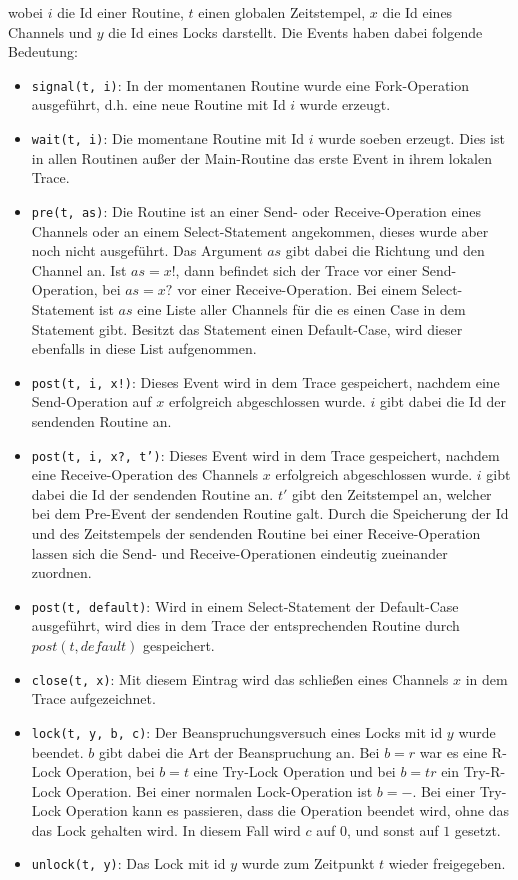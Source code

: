 wobei $i$ die Id einer Routine, $t$ einen globalen Zeitstempel, $x$ die Id eines 
Channels und $y$ die Id eines Locks darstellt. Die Events haben dabei folgende Bedeutung:
\begin{itemize}
  \item \texttt{signal(t, i)}: In der momentanen Routine wurde
    eine Fork-Operation ausgeführt,
    d.h. eine neue Routine mit Id $i$ wurde erzeugt.
  \item \texttt{wait(t, i)}: Die momentane Routine mit Id $i$ wurde soeben erzeugt. Dies ist 
    in allen Routinen außer der Main-Routine das erste Event in ihrem lokalen Trace.
  \item \texttt{pre(t, as)}: Die Routine ist an einer Send- oder Receive-Operation eines 
    Channels oder an einem Select-Statement angekommen, dieses wurde aber noch nicht 
    ausgeführt. Das Argument $as$ gibt dabei die Richtung und den Channel an. 
    Ist $as = x!$, dann befindet sich der Trace vor einer Send-Operation, bei 
    $as = x?$ vor einer Receive-Operation. Bei einem Select-Statement ist 
    $as$ eine Liste aller Channels für die es einen 
    Case in dem Statement gibt. Besitzt das Statement einen Default-Case, wird
    dieser ebenfalls in diese List aufgenommen.
  \item \texttt{post(t, i, x!)}: Dieses Event wird in dem Trace gespeichert, nachdem 
    eine Send-Operation auf $x$ erfolgreich abgeschlossen wurde. 
    $i$ gibt dabei die Id der sendenden Routine
    an.
  \item \texttt{post(t, i, x?, t')}: Dieses Event wird in dem Trace gespeichert, nachdem 
    eine Receive-Operation des Channels $x$ erfolgreich abgeschlossen wurde. 
    $i$ gibt dabei die Id der sendenden Routine an. $t'$ gibt den Zeitstempel an,
    welcher bei dem Pre-Event der sendenden Routine galt. Durch die Speicherung der Id und des 
    Zeitstempels der sendenden Routine bei einer Receive-Operation lassen sich 
    die Send- und Receive-Operationen eindeutig zueinander zuordnen.
  \item \texttt{post(t, default)}: Wird in einem Select-Statement der Default-Case ausgeführt,
    wird dies in dem Trace der entsprechenden Routine durch $post(t, default)$ 
    gespeichert.
  \item \texttt{close(t, x)}: Mit diesem Eintrag wird das schließen eines Channels $x$ 
    in dem Trace aufgezeichnet.
  \item \texttt{lock(t, y, b, c)}: Der Beanspruchungsversuch eines Locks mit id $y$ wurde beendet. 
    $b$ gibt dabei die Art der Beanspruchung an. Bei $b = r$ war es eine R-Lock
    Operation, bei $b = t$ eine Try-Lock Operation und bei $b = tr$ ein Try-R-Lock
    Operation. Bei einer normalen Lock-Operation ist $b = -$. Bei einer 
    Try-Lock Operation kann es passieren, dass die Operation beendet wird, 
    ohne das das Lock gehalten wird. In diesem Fall wird $c$ auf $0$, und 
    sonst auf $1$ gesetzt. 
  \item \texttt{unlock(t, y)}: Das Lock mit id $y$ wurde zum Zeitpunkt 
    $t$ wieder freigegeben. 
\end{itemize}



